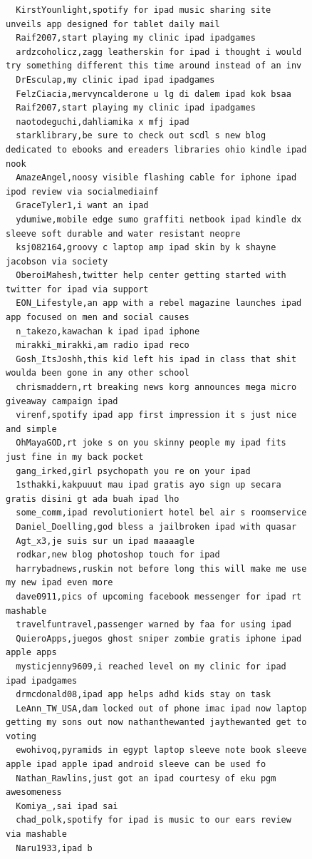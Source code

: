 \begin{figure}[htpb]
\begin{verbatim}
  KirstYounlight,spotify for ipad music sharing site unveils app designed for tablet daily mail
  Raif2007,start playing my clinic ipad ipadgames
  ardzcoholicz,zagg leatherskin for ipad i thought i would try something different this time around instead of an inv
  DrEsculap,my clinic ipad ipad ipadgames
  FelzCiacia,mervyncalderone u lg di dalem ipad kok bsaa
  Raif2007,start playing my clinic ipad ipadgames
  naotodeguchi,dahliamika x mfj ipad
  starklibrary,be sure to check out scdl s new blog dedicated to ebooks and ereaders libraries ohio kindle ipad nook
  AmazeAngel,noosy visible flashing cable for iphone ipad ipod review via socialmediainf
  GraceTyler1,i want an ipad
  ydumiwe,mobile edge sumo graffiti netbook ipad kindle dx sleeve soft durable and water resistant neopre
  ksj082164,groovy c laptop amp ipad skin by k shayne jacobson via society
  OberoiMahesh,twitter help center getting started with twitter for ipad via support
  EON_Lifestyle,an app with a rebel magazine launches ipad app focused on men and social causes
  n_takezo,kawachan k ipad ipad iphone
  mirakki_mirakki,am radio ipad reco
  Gosh_ItsJoshh,this kid left his ipad in class that shit woulda been gone in any other school
  chrismaddern,rt breaking news korg announces mega micro giveaway campaign ipad
  virenf,spotify ipad app first impression it s just nice and simple
  OhMayaGOD,rt joke s on you skinny people my ipad fits just fine in my back pocket
  gang_irked,girl psychopath you re on your ipad
  1sthakki,kakpuuut mau ipad gratis ayo sign up secara gratis disini gt ada buah ipad lho
  some_comm,ipad revolutioniert hotel bel air s roomservice
  Daniel_Doelling,god bless a jailbroken ipad with quasar
  Agt_x3,je suis sur un ipad maaaagle
  rodkar,new blog photoshop touch for ipad
  harrybadnews,ruskin not before long this will make me use my new ipad even more
  dave0911,pics of upcoming facebook messenger for ipad rt mashable
  travelfuntravel,passenger warned by faa for using ipad
  QuieroApps,juegos ghost sniper zombie gratis iphone ipad apple apps
  mysticjenny9609,i reached level on my clinic for ipad ipad ipadgames
  drmcdonald08,ipad app helps adhd kids stay on task
  LeAnn_TW_USA,dam locked out of phone imac ipad now laptop getting my sons out now nathanthewanted jaythewanted get to voting
  ewohivoq,pyramids in egypt laptop sleeve note book sleeve apple ipad apple ipad android sleeve can be used fo
  Nathan_Rawlins,just got an ipad courtesy of eku pgm awesomeness
  Komiya_,sai ipad sai
  chad_polk,spotify for ipad is music to our ears review via mashable
  Naru1933,ipad b

\end{verbatim}
\end{figure}
